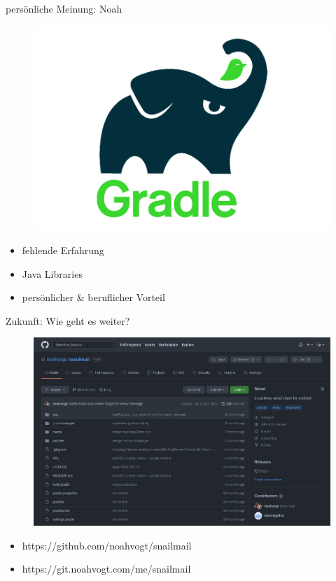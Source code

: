 \documentclass[aspectratio=169]{beamer}
\begin{document}
\begin{frame}{persönliche Meinung: Noah}
    \begin{varwidth}{.4\textwidth}
        \begin{figure}
            \centering
            \includegraphics[width=.95\textwidth]{media/gradle-logo.png}
        \end{figure}
    \end{varwidth}
    \hfill
    \begin{varwidth}{.5\textwidth}
        \begin{itemize}\pause
            \item fehlende Erfahrung\pause
            \item Java Libraries\pause
            \item persönlicher \& beruflicher Vorteil
        \end{itemize}
    \end{varwidth} 
\end{frame}

\begin{frame}{Zukunft: Wie geht es weiter?}
    \begin{figure}
        \centering
        \includegraphics[height=.7\textheight]{media/github-repo.jpg}
    \end{figure}
    \begin{itemize}
        \centering
        \item https://github.com/noahvogt/snailmail
        \item https://git.noahvogt.com/me/snailmail
    \end{itemize}
\end{frame}
\end{document}
